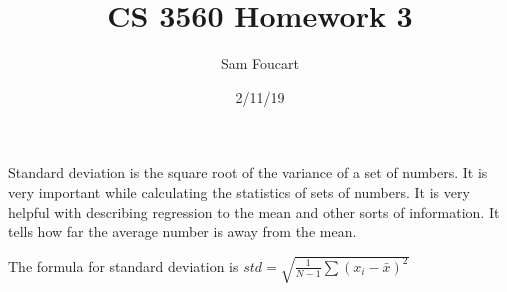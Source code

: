 \documentclass[12 pt, letterpaper] {article}
\title{CS 3560 Homework 3}
\author{Sam Foucart}
\date{2/11/19}
\begin{document}
\begin{titlepage}
\maketitle
\end{titlepage}

\setlength{\parindent}{4em}
	Standard deviation is the square root of the variance of a set of numbers. It is very important while calculating the statistics of sets of numbers. It is very helpful with describing regression to the mean and other sorts of information. It tells how far the average number is away from the mean.
\begin{center}
The formula for standard deviation is $std =\sqrt{\frac{1}{N-1}\sum(x_i-\bar{x})^2}$
\end{center}
\par
\end{document}

